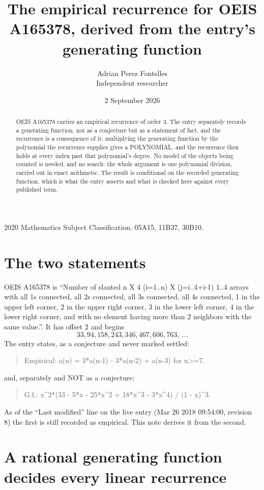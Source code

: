 \documentclass[11pt,a4paper]{article}
\title{The empirical recurrence for OEIS A165378, derived from the entry's generating function}
\author{Adrian Perez Fontelles\\ \small Independent researcher}
\date{2 September 2026}
\theoremstyle{plain}
\theoremstyle{definition}
\begin{document}
\maketitle

\begin{abstract}
OEIS A165378 carries an empirical recurrence of order $3$. The entry separately records a
generating function, not as a conjecture but as a statement of fact, and the recurrence is a
consequence of it: multiplying the generating function by the polynomial the recurrence
supplies gives a POLYNOMIAL, and the recurrence then holds at every index past that
polynomial's degree. No model of the objects being counted is needed, and no search: the
whole argument is one polynomial division, carried out in exact arithmetic. The result is
conditional on the recorded generating function, which is what the entry asserts and what is
checked here against every published term.
\end{abstract}

\noindent\small 2020 Mathematics Subject Classification. 05A15, 11B37, 30B10.\normalsize

\section{The two statements}

OEIS A165378 is ``Number of slanted n X 4 (i=1..n) X (j=i..4+i-1) 1..4 arrays with all 1s connected, all 2s connected, all 3s connected, all 4s connected, 1 in the upper left corner, 2 in the upper right corner, 3 in the lower left corner, 4 in the lower right corner, and with no element having more than 2 neighbors with the same value.''. It has offset $2$ and begins
\[
33, 94, 158, 243, 346, 467, 606, 763,\ \dots
\]
The entry states, as a conjecture and never marked settled:
\begin{quote}
Empirical: a(n) = 3*a(n-1) - 3*a(n-2) + a(n-3) for n>=7.
\end{quote}
and, separately and NOT as a conjecture:
\begin{quote}
G.f.: x\^{}2*(33 - 5*x - 25*x\^{}2 + 18*x\^{}3 - 3*x\^{}4) / (1 - x)\^{}3.
\end{quote}
As of the ``Last modified'' line on the live entry (Mar 26 2018 09:54:00, revision 8) the first is still
recorded as empirical. This note derives it from the second.

\section{A rational generating function decides every linear recurrence}
\end{document}
